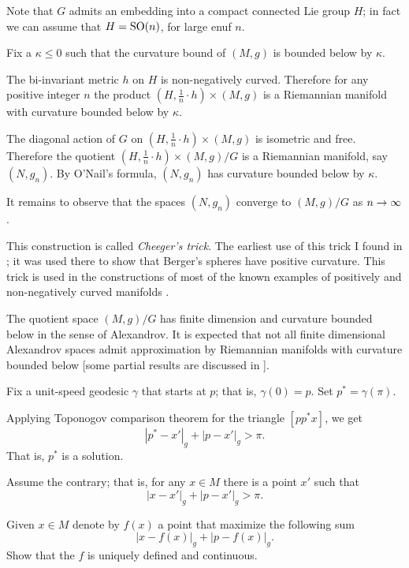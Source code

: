 Note that $G$ admits an embedding into a compact connected Lie group $H$;
in fact we can assume that $H=\mathrm{SO}(n)$, for large enuf $n$.

Fix a $\kappa\le 0$ such that the curvature bound of $(M,g)$ is bounded below by $\kappa$.

The bi-invariant metric $h$ on $H$ is non-negatively curved.
Therefore for any positive integer $n$ the product $(H,\tfrac1n\cdot h)\times (M,g)$ is a Riemannian manifold with  curvature bounded below by $\kappa$.

The diagonal action of $G$ on $(H,\tfrac1n\cdot h)\times (M,g)$ is        isometric and free. 
Therefore 
the quotient $(H,\tfrac1n\cdot h)\times (M,g)/G$
is a Riemannian manifold, say $(N,g_n)$.
By O'Nail's formula, $(N,g_n)$ has curvature bounded below by $\kappa$.

It remains to observe that the spaces $(N,g_n)$ converge to $(M,g)/G$ as $n\z\to \infty$.\qeds

This construction is called \emph{Cheeger's trick}.
The earliest use of this trick I found in \cite{GKM}; 
it was used there to show that Berger's spheres have positive curvature.
This trick is used in the constructions of most of the known examples of positively and non-negatively curved manifolds
 \cite[see][]{cheeger,aloff-wallach,gromoll-meyer,eschenburg-spaces,bazajkin}.
 
The quotient space  $(M,g)/G$ has finite dimension and curvature bounded below in the sense of Alexandrov. 
It is expected that not all finite dimensional Alexandrov spaces admit approximation by Riemannian manifolds with curvature bounded below
[some partial results are discussed in ].








Fix a unit-speed geodesic $\gamma$ that starts at $p$;
that is, $\gamma(0)=p$.
Set $p^*=\gamma(\pi)$.

Applying Toponogov comparison theorem for the triangle $[pp^*x]$, we get
\[|p^*-x'|_g+|p-x'|_g>\pi.\]
That is, $p^*$ is a solution.
\qeds

Assume the contrary;
that is, for any $x\in M$ there is a point $x'$ such that 
\[|x-x'|_g+|p-x'|_g>\pi.\]

Given $x\in M$ denote by $f(x)$ a point that maximize the following sum 
\[|x-f(x)|_g+|p-f(x)|_g.\]
Show that the $f$ is uniquely defined and continuous.

